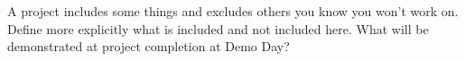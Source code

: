 


A project includes some things and excludes others you know you won't work on. Define more explicitly what is included and not included here. What will be demonstrated at project completion at Demo Day?